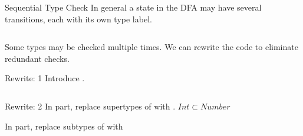\begin{frame}{Sequential Type Check}
  In general a state in the DFA may have several transitions, each with its own type label.
  \begin{columns}
    \begin{column}{0.5\textwidth}
      \usebox\typecaseAbox
    \end{column}
    \begin{column}{0.5\textwidth}  %
      \scalebox{0.9}{}
    \end{column}    
  \end{columns}

  Some types may be checked multiple times.  We can rewrite the code to eliminate redundant checks.

\end{frame}


\begin{frame}{Rewrite: 1}
  Introduce .

  \begin{columns}
    \begin{column}{0.5\textwidth}
      \usebox\typecaseAbox
    \end{column}
    \begin{column}{0.5\textwidth}  %
      \usebox\typecaseBbox
    \end{column}    
  \end{columns}
\end{frame}

\begin{frame}{Rewrite: 2}
  In  part, replace supertypes of  with .  $Int\subset Number$
  
  In  part, replace subtypes of  with 

  \begin{columns}
    \begin{column}{0.5\textwidth}
      \usebox\typecaseBbox
    \end{column}
    \begin{column}{0.5\textwidth}  %
      \usebox\typecaseCbox
    \end{column}    
  \end{columns}
\end{frame}



